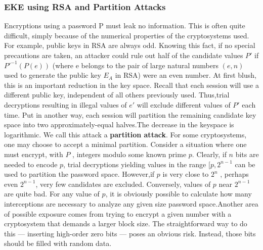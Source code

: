 \documentclass{article}
\begin{document}
\subsubsection{EKE using RSA and Partition Attacks}
Encryptions using a password P must leak no information. This is often quite difficult, simply because of the numerical properties of the cryptosystems used. For example, public keys in RSA are always odd. Knowing this fact, if no special precautions are taken, an attacker could rule out half of the candidate values $P'$ if $P'^{-1}(P(e))$ (where e belongs to the pair of large natural numbers $(e, n)$ used to generate the public key $E_A$ in RSA) were an even number. At first blush, this is an important reduction in the key space.
\newline Recall that each session will use a different public key,  independent of all others previously used.  Thus,trial  decryptions  resulting  in  illegal  values  of $e′$ will exclude different values of $P′$ each time.  Put in another way,  each session will partition the remaining candidate  key  space  into  two  approximately-equal  halves.The decrease in the keyspace is logarithmic.
\newline We  call  this  attack  a \textbf{partition attack}. For some cryptosystems, one may choose to accept a minimal partition.  Consider a situation where one must  encrypt,  with $P$ ,  integers  modulo  some  known prime $p$.  Clearly, if $n$ bits are needed to encode $p$, trial decryptions yielding values in the range $[p,2^{n−1}$ can be  used  to  partition  the  password  space.   However,if $p$ is  very  close  to  $2^n$ ,  perhaps  even  $2^{n−1}$,  very few candidates are excluded.  Conversely, values of $p$ near   $2^{n−1}$ are  quite  bad.   For  any  value  of $p$,  it  is obviously possible to calculate how many interceptions are necessary to analyze any given size password space.Another area of possible exposure comes from trying  to  encrypt  a  given  number  with  a  cryptosystem that demands a larger block size.  The straightforward way  to  do  this  —  inserting  high-order  zero  bits  — poses an obvious risk.  Instead,  those bits should be filled with random data.
\end{document}
